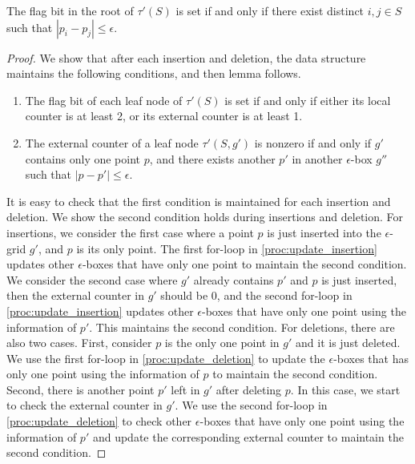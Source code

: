 \begin{lemma}
  The flag bit in the root of $\tau'(S)$ is set if and only if there exist  distinct $i, j \in S$ such that $|p_i - p_j| \leq \epsilon$.
\end{lemma}
\begin{proof}
  We show that after each insertion and deletion, the data structure maintains the following conditions, and then lemma follows.
  \begin{enumerate}
    \item The flag bit of each leaf node of $\tau'(S)$ is set if and only if either its local counter is at least 2, or its external counter is at least 1.
    \item The external counter of a leaf node $\tau'(S, g')$ is nonzero if and only if $g'$ contains only one point $p$, and there exists another $p'$ in another $\epsilon$-box $g''$ such that $|p - p'| \leq \epsilon$.
  \end{enumerate}
  It is easy to check that the first condition is maintained for each insertion and deletion. We show the second condition holds during insertions and deletion. For insertions, we consider the first case where a point $p$ is just inserted into the $\epsilon$-grid $g'$, and $p$ is its only point. The first for-loop in \cref{proc:update_insertion} updates other $\epsilon$-boxes that have only one point to maintain the second condition. We consider the second case where $g'$ already contains $p'$ and $p$ is just inserted, then the external counter in $g'$ should be 0, and the second for-loop in \cref{proc:update_insertion} updates other $\epsilon$-boxes that have only one point using the information of $p'$. This maintains the second condition. For deletions, there are also two cases. First, consider $p$ is the only one point in $g'$ and it is just deleted. We use the first for-loop in \cref{proc:update_deletion} to update the $\epsilon$-boxes that has only one point using the information of $p$ to maintain the second condition. Second, there is another point $p'$ left in $g'$ after deleting $p$. In this case, we start to check the external counter in $g'$. We use the second for-loop in \cref{proc:update_deletion} to check other $\epsilon$-boxes that have only one point using the information of $p'$ and update the corresponding external counter to maintain the second condition.
\end{proof}


